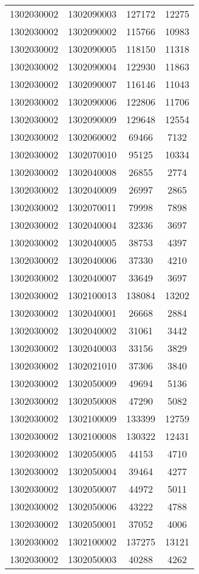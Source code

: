 \begin{longtable}[h]{llcc}
		1302030002 & 1302090003 & 127172 & 12275\\
		1302030002 & 1302090002 & 115766 & 10983\\
		1302030002 & 1302090005 & 118150 & 11318\\
		1302030002 & 1302090004 & 122930 & 11863\\
		1302030002 & 1302090007 & 116146 & 11043\\
		1302030002 & 1302090006 & 122806 & 11706\\
		1302030002 & 1302090009 & 129648 & 12554\\
		1302030002 & 1302060002 & 69466 & 7132\\
		1302030002 & 1302070010 & 95125 & 10334\\
		1302030002 & 1302040008 & 26855 & 2774\\
		1302030002 & 1302040009 & 26997 & 2865\\
		1302030002 & 1302070011 & 79998 & 7898\\
		1302030002 & 1302040004 & 32336 & 3697\\
		1302030002 & 1302040005 & 38753 & 4397\\
		1302030002 & 1302040006 & 37330 & 4210\\
		1302030002 & 1302040007 & 33649 & 3697\\
		1302030002 & 1302100013 & 138084 & 13202\\
		1302030002 & 1302040001 & 26668 & 2884\\
		1302030002 & 1302040002 & 31061 & 3442\\
		1302030002 & 1302040003 & 33156 & 3829\\
		1302030002 & 1302021010 & 37306 & 3840\\
		1302030002 & 1302050009 & 49694 & 5136\\
		1302030002 & 1302050008 & 47290 & 5082\\
		1302030002 & 1302100009 & 133399 & 12759\\
		1302030002 & 1302100008 & 130322 & 12431\\
		1302030002 & 1302050005 & 44153 & 4710\\
		1302030002 & 1302050004 & 39464 & 4277\\
		1302030002 & 1302050007 & 44972 & 5011\\
		1302030002 & 1302050006 & 43222 & 4788\\
		1302030002 & 1302050001 & 37052 & 4006\\
		1302030002 & 1302100002 & 137275 & 13121\\
		1302030002 & 1302050003 & 40288 & 4262\\

\end{longtable}

